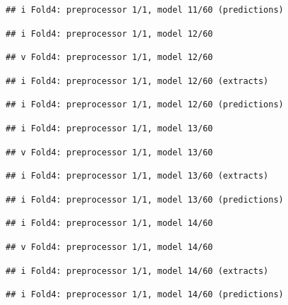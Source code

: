 \documentclass[
]{article}
\begin{document}
\begin{verbatim}
## i Fold4: preprocessor 1/1, model 11/60 (predictions)
\end{verbatim}

\begin{verbatim}
## i Fold4: preprocessor 1/1, model 12/60
\end{verbatim}

\begin{verbatim}
## v Fold4: preprocessor 1/1, model 12/60
\end{verbatim}

\begin{verbatim}
## i Fold4: preprocessor 1/1, model 12/60 (extracts)
\end{verbatim}

\begin{verbatim}
## i Fold4: preprocessor 1/1, model 12/60 (predictions)
\end{verbatim}

\begin{verbatim}
## i Fold4: preprocessor 1/1, model 13/60
\end{verbatim}

\begin{verbatim}
## v Fold4: preprocessor 1/1, model 13/60
\end{verbatim}

\begin{verbatim}
## i Fold4: preprocessor 1/1, model 13/60 (extracts)
\end{verbatim}

\begin{verbatim}
## i Fold4: preprocessor 1/1, model 13/60 (predictions)
\end{verbatim}

\begin{verbatim}
## i Fold4: preprocessor 1/1, model 14/60
\end{verbatim}

\begin{verbatim}
## v Fold4: preprocessor 1/1, model 14/60
\end{verbatim}

\begin{verbatim}
## i Fold4: preprocessor 1/1, model 14/60 (extracts)
\end{verbatim}

\begin{verbatim}
## i Fold4: preprocessor 1/1, model 14/60 (predictions)
\end{verbatim}
\end{document}
